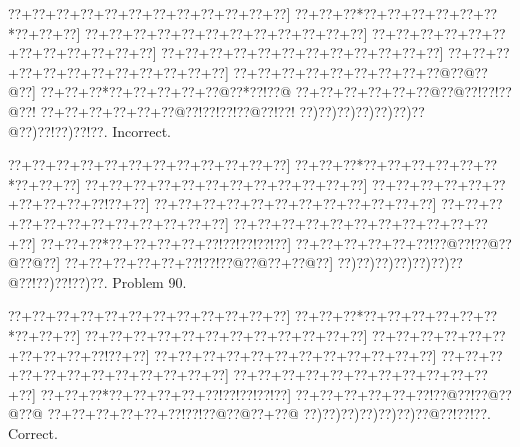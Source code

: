 \documentclass[a5paper]{article}
\begin{document}
\begin{center}
{\goo
\0??+\0??+\0??+\0??+\0??+\0??+\0??+\0??+\0??+\0??+\0??+\0??]
\0??+\0??+\0??*\0??+\0??+\0??+\0??+\0??+\0??*\0??+\0??+\0??]
\0??+\0??+\0??+\0??+\0??+\0??+\0??+\0??+\0??+\0??+\0??+\0??]
\0??+\0??+\0??+\0??+\0??+\0??+\0??+\0??+\0??+\0??+\0??+\0??]
\0??+\0??+\0??+\0??+\0??+\0??+\0??+\0??+\0??+\0??+\0??+\0??]
\0??+\0??+\0??+\0??+\0??+\0??+\0??+\0??+\0??+\0??+\0??+\0??]
\0??+\0??+\0??+\0??+\0??+\0??+\0??+\0??+\0??@\0??@\0??@\0??]
\0??+\0??+\0??*\0??+\0??+\0??+\0??+\0??@\0??*\0??!\0??@
\0??+\0??+\0??+\0??+\0??+\0??@\0??@\0??!\0??!\0??@\0??!
\0??+\0??+\0??+\0??+\0??+\0??@\0??!\0??!\0??!\0??@\0??!\0??!
\0??)\0??)\0??)\0??)\0??)\0??)\0??@\0??)\0??!\0??)\0??!\0??.
}
Incorrect. 

\end{center}
\newpage
\begin{center}
{\goo
\0??+\0??+\0??+\0??+\0??+\0??+\0??+\0??+\0??+\0??+\0??+\0??]
\0??+\0??+\0??*\0??+\0??+\0??+\0??+\0??+\0??*\0??+\0??+\0??]
\0??+\0??+\0??+\0??+\0??+\0??+\0??+\0??+\0??+\0??+\0??+\0??]
\0??+\0??+\0??+\0??+\0??+\0??+\0??+\0??+\0??+\0??!\0??+\0??]
\0??+\0??+\0??+\0??+\0??+\0??+\0??+\0??+\0??+\0??+\0??+\0??]
\0??+\0??+\0??+\0??+\0??+\0??+\0??+\0??+\0??+\0??+\0??+\0??]
\0??+\0??+\0??+\0??+\0??+\0??+\0??+\0??+\0??+\0??+\0??+\0??]
\0??+\0??+\0??*\0??+\0??+\0??+\0??+\0??!\0??!\0??!\0??!\0??]
\0??+\0??+\0??+\0??+\0??+\0??!\0??@\0??!\0??@\0??@\0??@\0??]
\0??+\0??+\0??+\0??+\0??+\0??!\0??!\0??@\0??@\0??+\0??@\0??]
\0??)\0??)\0??)\0??)\0??)\0??)\0??@\0??!\0??)\0??!\0??)\0??.
}
Problem 90.

\end{center}
\begin{center}
{\goo
\0??+\0??+\0??+\0??+\0??+\0??+\0??+\0??+\0??+\0??+\0??+\0??]
\0??+\0??+\0??*\0??+\0??+\0??+\0??+\0??+\0??*\0??+\0??+\0??]
\0??+\0??+\0??+\0??+\0??+\0??+\0??+\0??+\0??+\0??+\0??+\0??]
\0??+\0??+\0??+\0??+\0??+\0??+\0??+\0??+\0??+\0??!\0??+\0??]
\0??+\0??+\0??+\0??+\0??+\0??+\0??+\0??+\0??+\0??+\0??+\0??]
\0??+\0??+\0??+\0??+\0??+\0??+\0??+\0??+\0??+\0??+\0??+\0??]
\0??+\0??+\0??+\0??+\0??+\0??+\0??+\0??+\0??+\0??+\0??+\0??]
\0??+\0??+\0??*\0??+\0??+\0??+\0??+\0??!\0??!\0??!\0??!\0??]
\0??+\0??+\0??+\0??+\0??+\0??!\0??@\0??!\0??@\0??@\0??@
\0??+\0??+\0??+\0??+\0??+\0??!\0??!\0??@\0??@\0??+\0??@
\0??)\0??)\0??)\0??)\0??)\0??)\0??@\0??!\0??!\0??.
}
Correct. 

\end{center}
\end{document}
